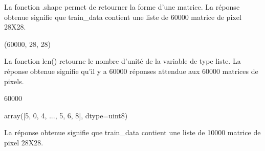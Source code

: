 \documentclass[letterpaper,10pt,french]{sphinxmanual}
\begin{document}
\begin{sphinxVerbatim}[commandchars=\\\{\}]
   
\end{sphinxVerbatim}

La fonction .shape permet de retourner la forme d’une matrice. La réponse obtenue signifie que train\_data contient une liste de 60000 matrice de pixel 28X28.

\begin{sphinxVerbatim}[commandchars=\\\{\}]
\end{sphinxVerbatim}

\begin{sphinxVerbatim}[commandchars=\\\{\}]
(60000, 28, 28)
\end{sphinxVerbatim}

La fonction len() retourne le nombre d’unité de la variable de type liste. La réponse obtenue signifie qu’il y a 60000 réponses attendue aux 60000 matrices de pixels.

\begin{sphinxVerbatim}[commandchars=\\\{\}]
\end{sphinxVerbatim}

\begin{sphinxVerbatim}[commandchars=\\\{\}]
60000
\end{sphinxVerbatim}

\begin{sphinxVerbatim}[commandchars=\\\{\}]
\end{sphinxVerbatim}

\begin{sphinxVerbatim}[commandchars=\\\{\}]
array([5, 0, 4, ..., 5, 6, 8], dtype=uint8)
\end{sphinxVerbatim}

La réponse obtenue signifie que train\_data contient une liste de 10000 matrice de pixel 28X28.

\begin{sphinxVerbatim}[commandchars=\\\{\}]
\end{sphinxVerbatim}
\end{document}
